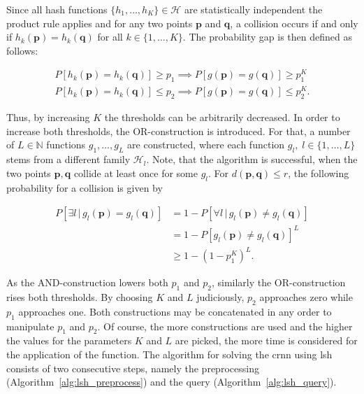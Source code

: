 \documentclass[../../../main.tex]{subfiles}
\begin{document}
Since all hash functions $\{h_1, \dots, h_K\} \in \mathcal{H}$ are statistically independent the product rule applies and for any two points $\bm{p}$ and $\bm{q}$, a collision occurs if and only if $h_k(\bm{p})=h_k(\bm{q})$ for all $k \in \{1, \dots, K\}$. The probability gap is then defined as follows:

\begin{align*}
    P[h_k(\bm{p})=h_k(\bm{q})] \geq p_1 \implies P[g(\bm{p})=g(\bm{q})] \geq p_1^K \\
    P[h_k(\bm{p})=h_k(\bm{q})] \leq p_2 \implies P[g(\bm{p})=g(\bm{q})] \leq p_2^K.
\end{align*}

Thus, by increasing $K$ the thresholds can be arbitrarily decreased. In order to increase both thresholds, the OR-construction is introduced. For that, a number of $L \in \mathbb{N}$ functions $g_1, \dots, g_L$ are constructed, where each function $g_l, \; l \in \{1, \dots, L\}$ stems from a different family $\mathcal{H}_l$. Note, that the algorithm is successful, when the two points $\bm{p}, \bm{q}$ collide at least once for some $g_l$. For $d(\bm{p}, \bm{q}) \leq r$, the following probability for a collision is given by

\begin{align*}
    P[\exists l \, | \, g_l(\bm{p})=g_l(\bm{q})] &= 1 - P[\forall l \,|\, g_l(\bm{p}) \neq g_l(\bm{q})] \\
                                &= 1 - P[g_l(\bm{p}) \neq g_l(\bm{q})]^L \\
                                &\geq 1 - (1-p_1^K)^L.
\end{align*}

As the AND-construction lowers both $p_1$ and $p_2$, similarly the OR-construction rises both thresholds. By choosing $K$ and $L$ judiciously, $p_2$ approaches zero while $p_1$ approaches one. Both constructions may be concatenated in any order to manipulate $p_1$ and $p_2$. Of course, the more constructions are used and the higher the values for the parameters $K$ and $L$ are picked, the more time is considered for the application of the function. The algorithm for solving the \gls{crnn} using \gls{lsh} consists of two consecutive steps, namely the preprocessing (Algorithm~\ref{alg:lsh_preprocess}) and the query (Algorithm~\ref{alg:lsh_query}).
\end{document}
